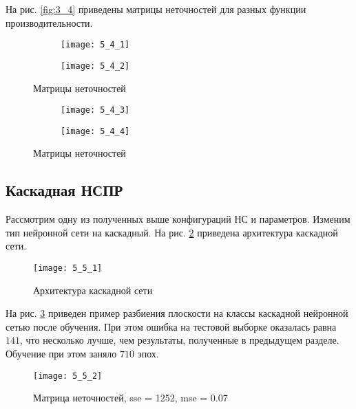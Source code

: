 На рис. \ref{fig:3_4} приведены матрицы неточностей для разных функции производительности.
\vspace{-0.5cm}
\begin{figure}[H]
\begin{center}
	\begin{subfigure}[b]{0.49\textwidth}
		\texttt{[image: 5\_4\_1]}
		\caption{}
	\end{subfigure}
	\begin{subfigure}[b]{0.49\textwidth}
		\texttt{[image: 5\_4\_2]}
		\caption{}
	\end{subfigure}
	\caption{Матрицы неточностей}
\end{center}
\end{figure}
\begin{figure}[H]
\begin{center}
	\begin{subfigure}[b]{0.49\textwidth}
		\texttt{[image: 5\_4\_3]}
		\caption{}
	\end{subfigure}
	\begin{subfigure}[b]{0.49\textwidth}
		\texttt{[image: 5\_4\_4]}
		\caption{}
	\end{subfigure}
	\caption{Матрицы неточностей}
	\label{fig:4_4}
\end{center}
\end{figure}

\subsection{Каскадная НСПР}

Рассмотрим одну из полученных выше конфигураций НС и параметров. Изменим тип нейронной сети на каскадный. На рис. \ref{fig:4_5_1} приведена архитектура каскадной сети.

\begin{figure}[H]
\begin{center}
	\texttt{[image: 5\_5\_1]}
	\caption{Архитектура каскадной сети}
	\label{fig:4_5_1}
\end{center}
\end{figure}

\vspace{-0.5cm}
На рис. \ref{fig:4_5_2} приведен пример разбиения плоскости на классы каскадной нейронной сетью после обучения. При этом ошибка  на тестовой выборке оказалась равна $141$, что несколько лучше, чем результаты, полученные в предыдущем разделе. Обучение при этом заняло $710$ эпох.
\vspace{-0.5cm}
\begin{figure}[H]
\begin{center}
	\texttt{[image: 5\_5\_2]}
	\caption{Матрица неточностей, sse = 1252, mse = 0.07}
	\label{fig:4_5_2}
\end{center}
\end{figure}
\vspace{-1cm}

